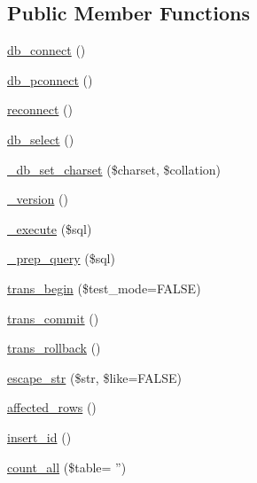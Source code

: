 \subsection*{Public Member Functions}
\begin{DoxyCompactItemize}
\item 
\hyperlink{class_c_i___d_b__mysqli__driver_a6aa545dcb7768f0b62d37cdcf7f09adc}{db\-\_\-connect} ()
\item 
\hyperlink{class_c_i___d_b__mysqli__driver_a0f69e662bd02de5bcf98647068e7c653}{db\-\_\-pconnect} ()
\item 
\hyperlink{class_c_i___d_b__mysqli__driver_a57c19c642ab3023e28d10c50f86ff0a8}{reconnect} ()
\item 
\hyperlink{class_c_i___d_b__mysqli__driver_af0c7f2602586ea2050b19fb36baefb24}{db\-\_\-select} ()
\item 
\hyperlink{class_c_i___d_b__mysqli__driver_ae8accd162bbc9805ae8275d0626c6678}{\-\_\-db\-\_\-set\-\_\-charset} (\$charset, \$collation)
\item 
\hyperlink{class_c_i___d_b__mysqli__driver_ac997a462bb342f97f414910f0e033fb6}{\-\_\-version} ()
\item 
\hyperlink{class_c_i___d_b__mysqli__driver_a114ab675d89bf8324a41785fb475e86d}{\-\_\-execute} (\$sql)
\item 
\hyperlink{class_c_i___d_b__mysqli__driver_a86af88ef0fa6d44ab4691e3f53270339}{\-\_\-prep\-\_\-query} (\$sql)
\item 
\hyperlink{class_c_i___d_b__mysqli__driver_a90e153cf190d273336d77cce930587e1}{trans\-\_\-begin} (\$test\-\_\-mode=F\-A\-L\-S\-E)
\item 
\hyperlink{class_c_i___d_b__mysqli__driver_af4fbdcdace4aa94a139b64877601fe9b}{trans\-\_\-commit} ()
\item 
\hyperlink{class_c_i___d_b__mysqli__driver_a53f76d4dfcd6ac04fb653982442aeef8}{trans\-\_\-rollback} ()
\item 
\hyperlink{class_c_i___d_b__mysqli__driver_aaba16891c8c93600a87075800cc5b72b}{escape\-\_\-str} (\$str, \$like=F\-A\-L\-S\-E)
\item 
\hyperlink{class_c_i___d_b__mysqli__driver_a77248aaad33eb132c04cc4aa3f4bc8cb}{affected\-\_\-rows} ()
\item 
\hyperlink{class_c_i___d_b__mysqli__driver_a933f2cde8dc7f87875e257d0a4902e99}{insert\-\_\-id} ()
\item 
\hyperlink{class_c_i___d_b__mysqli__driver_a66111c61856499b091af32502978d4fc}{count\-\_\-all} (\$table= '')
\item 

\end{DoxyCompactItemize}
